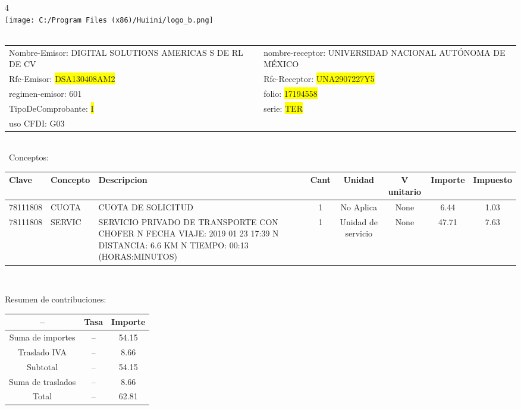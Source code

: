 \documentclass{article}
\begin{document}
\hspace{18cm} 4\\
\texttt{[image: C:/Program Files (x86)/Huiini/logo\_b.png]}
\bigskip\\\
\begin{tabular}{p{11cm}p{1cm}p{8cm}}

Nombre-Emisor: DIGITAL SOLUTIONS AMERICAS S DE RL DE CV && nombre-receptor: UNIVERSIDAD NACIONAL AUTÓNOMA DE MÉXICO\\

Rfc-Emisor: \colorbox{yellow}{ DSA130408AM2 } & & Rfc-Receptor: \colorbox{yellow}{ UNA2907227Y5 }\\

regimen-emisor: 601 & & folio: \colorbox{yellow}{ 17194558 }\\

TipoDeComprobante: \colorbox{yellow}{ I } & & serie: \colorbox{yellow}{ TER }\\

uso CFDI: G03\\



\end{tabular}
\bigskip\bigskip\bigskip\\\
Conceptos:\\
\begin{tabular}{|p{1.5cm}|p{3.6cm}|p{3.6cm}|c|c|c|c|c|}
\hline
Clave & Concepto & Descripcion & Cant & Unidad & V unitario & Importe & Impuesto \\
\hline

78111808 & CUOTA  & CUOTA DE SOLICITUD & 1 & No Aplica & None & 6.44 &  1.03 \\
\hline

78111808 & SERVIC & SERVICIO PRIVADO DE TRANSPORTE CON CHOFER  N FECHA VIAJE: 2019 01 23 17:39  N DISTANCIA: 6.6 KM  N TIEMPO: 00:13 (HORAS:MINUTOS) & 1 & Unidad de servicio & None & 47.71 &  7.63 \\
\hline

\end{tabular}\\
\bigskip
\begin{center}
Resumen de contribuciones:\\
\bigskip
\begin{tabular}{|c|c|c|}
\hline
 -- & Tasa & Importe\\
\hline

Suma de importes & -- & 54.15 \\
\hline

Traslado IVA & -- & 8.66 \\
\hline

Subtotal  & -- & 54.15 \\
\hline

Suma de traslados & -- & 8.66 \\
\hline

Total  & -- & 62.81 \\
\hline

\end{tabular}
\end{center}
\end{document}
